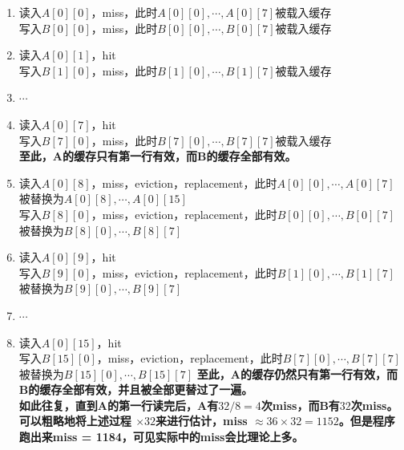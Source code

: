 \documentclass[12pt, a4paper, oneside]{ctexart}
\begin{document}
\begin{enumerate}
    \item 读入$A[0][0]$，miss，此时$A[0][0],\cdots,A[0][7]$被载入缓存\\
          写入$B[0][0]$，miss，此时$B[0][0],\cdots,B[0][7]$被载入缓存
    \item 读入$A[0][1]$，hit\\
          写入$B[1][0]$，miss，此时$B[1][0],\cdots,B[1][7]$被载入缓存
    \item $\cdots$
    \item 读入$A[0][7]$，hit\\
          写入$B[7][0]$，miss，此时$B[7][0],\cdots,B[7][7]$被载入缓存\\
    \textbf{至此，A的缓存只有第一行有效，而B的缓存全部有效。}
    \item 读入$A[0][8]$，miss，eviction，replacement，此时$A[0][0],\cdots,A[0][7]$被替换为$A[0][8],\cdots,A[0][15]$\\
          写入$B[8][0]$，miss，eviction，replacement，此时$B[0][0],\cdots,B[0][7]$被替换为$B[8][0],\cdots,B[8][7]$
    \item 读入$A[0][9]$，hit\\
          写入$B[9][0]$，miss，eviction，replacement，此时$B[1][0],\cdots,B[1][7]$被替换为$B[9][0],\cdots,B[9][7]$
    \item $\cdots$
    \item 读入$A[0][15]$，hit\\
          写入$B[15][0]$，miss，eviction，replacement，此时$B[7][0],\cdots,B[7][7]$被替换为$B[15][0],\cdots,B[15][7]$
    \textbf{至此，A的缓存仍然只有第一行有效，而B的缓存全部有效，并且被全部更替过了一遍。}\\
    \textbf{如此往复，直到A的第一行读完后，A有$32/8 = 4$次miss，而B有$32$次miss。}\\
    \textbf{可以粗略地将上述过程 $\times 32$来进行估计，miss $\approx 36 \times 32 = 1152$。但是程序跑出来miss = 1184，可见实际中的miss会比理论上多。}
\end{enumerate}
\end{document}
